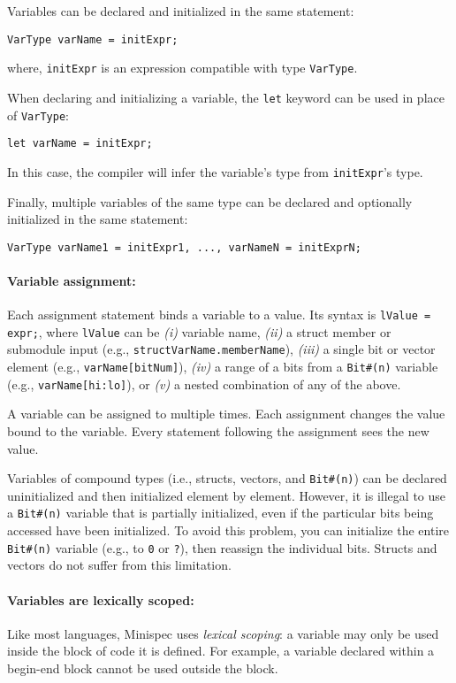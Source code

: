 Variables can be declared and initialized in the same statement:
\begin{center}
\verb|VarType varName = initExpr;|
\end{center}
where, \verb|initExpr| is an expression compatible with type \verb|VarType|.

When declaring and initializing a variable, the \verb|let| keyword can be used in place of \verb|VarType|:
\begin{center}
\verb|let varName = initExpr;|
\end{center}
In this case, the compiler will infer the variable's type from \verb|initExpr|'s type.

Finally, multiple variables of the same type can be declared and optionally initialized in the same statement:
\begin{center}
\verb|VarType varName1 = initExpr1, ..., varNameN = initExprN;|
\end{center}

\paragraph{Variable assignment:} Each assignment statement binds a variable to a value. Its syntax is %
\verb|lValue = expr;|,
where \verb|lValue| can be \emph{(i)} variable name,
\emph{(ii)} a struct member or submodule input (e.g., \verb|structVarName.memberName|),
\emph{(iii)} a single bit or vector element (e.g., \verb|varName[bitNum]|),
\emph{(iv)} a range of a bits from a \verb|Bit#(n)| variable (e.g., \verb|varName[hi:lo]|),
or \emph{(v)} a nested combination of any of the above.

A variable can be assigned to multiple times. Each assignment changes the value bound to the variable.
Every statement following the assignment sees the new value.

Variables of compound types (i.e., structs, vectors, and \verb|Bit#(n)|)
can be declared uninitialized and then initialized element by element.
However, it is illegal to use a \verb|Bit#(n)| variable that is partially initialized,
even if the particular bits being accessed have been initialized.
To avoid this problem, you can initialize the entire \verb|Bit#(n)| variable
(e.g., to \verb|0| or \verb|?|), then reassign the individual bits.
Structs and vectors do not suffer from this limitation.

\paragraph{Variables are lexically scoped:}
Like most languages, Minispec uses \emph{lexical scoping}: a variable may only be used inside the block of code it is defined.
For example, a variable declared within a begin-end block cannot be used outside the block.

